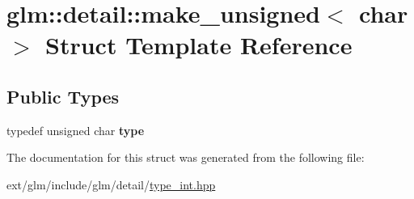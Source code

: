 \hypertarget{structglm_1_1detail_1_1make__unsigned_3_01char_01_4}{\section{glm\-:\-:detail\-:\-:make\-\_\-unsigned$<$ char $>$ Struct Template Reference}
\label{structglm_1_1detail_1_1make__unsigned_3_01char_01_4}
}
\subsection*{Public Types}
\begin{DoxyCompactItemize}
\item 
\hypertarget{structglm_1_1detail_1_1make__unsigned_3_01char_01_4_a473f89289be25f14bdc7c459e4be4fed}{typedef unsigned char {\bfseries type}}\label{structglm_1_1detail_1_1make__unsigned_3_01char_01_4_a473f89289be25f14bdc7c459e4be4fed}

\end{DoxyCompactItemize}


The documentation for this struct was generated from the following file\-:\begin{DoxyCompactItemize}
\item 
ext/glm/include/glm/detail/\hyperlink{type__int_8hpp}{type\-\_\-int.\-hpp}\end{DoxyCompactItemize}
